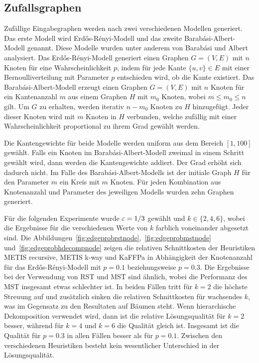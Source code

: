 \subsection{Zufallsgraphen}
Zufällige Eingabegraphen werden nach zwei verschiedenen Modellen generiert.
Das erste Modell wird Erdős-Rényi-Modell und das zweite Barabási-Albert-Modell genannt.
Diese Modelle wurden unter anderem von Barabási und Albert~\cite{AB02} analysiert.
Das Erdős-Rényi-Modell generiert einen Graphen $G=(V,E)$ mit $n$ Knoten für eine Wahrscheinlichkeit $p$, indem für jede Kante $\{u, v\} \in E$ mit einer Bernoulliverteilung mit Parameter $p$ entschieden wird, ob die Kante existiert.
Das Barabási-Albert-Modell erzeugt einen Graphen $G=(V,E)$ mit $n$ Knoten für ein Kantenanzahl $m$ aus einem Graphen $H$ mit $m_0$ Knoten, wobei $m \leq m_0 \leq n$ gilt.
Um $G$ zu erhalten, werden iterativ $n - m_0$ Knoten zu $H$ hinzugefügt.
Jeder dieser Knoten wird mit $m$ Knoten in $H$ verbunden, welche zufällig mit einer Wahrscheinlichkeit proportional zu ihrem Grad gewählt werden.

Die Kantengewichte für beide Modelle werden uniform aus dem Bereich $[1, 100]$ gewählt.
Falls ein Knoten im Barabási-Albert-Modell zweimal in einem Schritt gewählt wird, dann werden die Kantengewichte addiert.
Der Grad erhöht sich dadurch nicht.
Im Falle des Barabási-Albert-Modells ist der initiale Graph $H$ für den Parameter $m$ ein Kreis mit $m$ Knoten.
Für jeden Kombination aus Knotenanzahl und Parameter des jeweiligen Modells wurden zehn Graphen generiert.

Für die folgenden Experimente wurde $\varepsilon=1/3$ gewählt und $k \in \{2, 4, 6\}$, wobei die Ergebnisse für die verschiedenen Werte von $k$ farblich voneinander abgesetzt sind.
Die Abbildungen~\ref{fig:edgeprobrstnode},~\ref{fig:edgeprobmstnode} und~\ref{fig:edgeprobhdecompnode} zeigen die relativen Schnittkosten der Heuristiken METIS recursive, METIS k-way und KaFFPa in Abhängigkeit der Knotenanzahl für das Erdős-Rényi-Modell mit $p=0.1$ beziehungsweise $p=0.3$.
Die Ergebnisse bei der Verwendung von RST und MST sind ähnlich, wobei die Performanz des MST insgesamt etwas schlechter ist.
In beiden Fällen tritt für $k=2$ die höchste Streuung auf und zusätzlich sinken die relativen Schnittkosten für wachsendes $k$, was im Gegensatz zu den Resultaten auf Bäumen steht.
Wenn hierarchische Dekomposition verwendet wird, dann ist die relative Lösungsqualität für $k=2$ besser, während für $k=4$ und $k=6$ die Qualität gleich ist.
Insgesamt ist die Qualität für $p=0.3$ in allen Fällen besser als für $p=0.1$.
Zwischen den verschiedenen Heuristiken besteht kein wesentlicher Unterschied in der Lösungsqualität.

